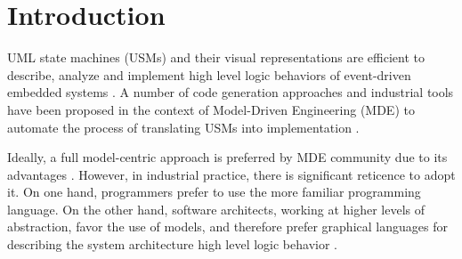 \section{Introduction}
\label{sec:intro}



UML state machines (USMs) and their visual representations are efficient to describe, analyze and implement high level logic behaviors of event-driven %
embedded systems \cite{Dunkels:2006:PSE:1182807.1182811}. 
A number of code generation approaches and industrial tools have been proposed in the context of Model-Driven Engineering (MDE) \cite{kent2002model} to automate the process of translating USMs into implementation \cite{possepapyrusrt, Booch1998, Douglass1999,Shalyto2006,Douglass1999, ibm_rhapsody, sinelabore, qm}.  

Ideally, a full model-centric approach is preferred by MDE community due to its advantages \cite{Selic2012}. 
However, in industrial practice, there is significant reticence \cite{Hutchinson:2011:MEP:1985793.1985882} to adopt it.
On one hand, programmers prefer to
use the more familiar programming language. 
On the other hand, software architects, working at higher levels
of abstraction, favor the use of models, and therefore
prefer graphical languages for describing the system architecture high level logic behavior \cite{Hutchinson:2011:MEP:1985793.1985882,Hutchinson:2011:EAM:1985793.1985858}.

